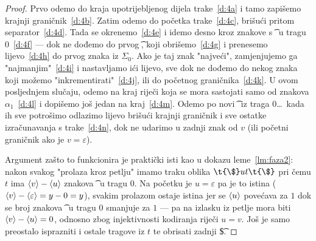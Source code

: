 \begin{proof}
Prvo odemo do kraja upotrijebljenog dijela trake~\eqref{d:4a} i tamo zapišemo krajnji graničnik~\eqref{d:4b}. Zatim odemo do početka trake~\eqref{d:4c}, brišući pritom separator~\eqref{d:4d}. Tada se okrenemo~\eqref{d:4e} i idemo desno kroz znakove s \t\textopenbullet\ u tragu $0$~\eqref{d:4f} --- dok ne dođemo do prvog \t\textbullet, koji obrišemo~\eqref{d:4g} i prenesemo lijevo~\eqref{d:4h} do prvog znaka iz $\Sigma_0$. Ako je taj znak "najveći", zamjenjujemo ga "najmanjim"~\eqref{d:4i} i nastavljamo ići lijevo, sve dok ne dođemo do nekog znaka koji možemo "inkrementirati"~\eqref{d:4j}, ili do početnog graničnika~\eqref{d:4k}. U ovom posljednjem slučaju, odemo na kraj riječi koja se mora sastojati samo od znakova $\alpha_1$~\eqref{d:4l} i dopišemo još jedan na kraj~\eqref{d:4m}. Odemo po novi~\t\textbullet\ iz traga $0$\dots\ kada ih sve potrošimo odlazimo lijevo brišući krajnji graničnik i sve ostatke izračunavanja s trake~\eqref{d:4n}, dok ne udarimo u zadnji znak od $v$ (ili početni graničnik ako je $v=\varepsilon$).

	Argument zašto to funkcionira je praktički isti kao u dokazu leme~\ref{lm:faza2}: nakon svakog "prolaza kroz petlju" imamo traku oblika $\t{\$}ut\t{\$}$ pri čemu $t$ ima $\langle v\rangle-\langle u\rangle$ znakova \t\textbullet\ u tragu $0$. Na početku je $u=\varepsilon$ pa je to istina ($\langle v\rangle-\langle\varepsilon\rangle=y-0=y$), svakim prolazom ostaje istina jer se $\langle u\rangle$ povećava za $1$ dok se broj znakova \t\textbullet\ u tragu $0$ smanjuje za $1$ --- pa na izlasku iz petlje mora biti $\langle v\rangle-\langle u\rangle=0$, odnosno zbog injektivnosti kodiranja riječi $u=v$. Još je samo preostalo isprazniti i ostale tragove iz $t$ te obrisati zadnji \t\$.
\end{proof}

